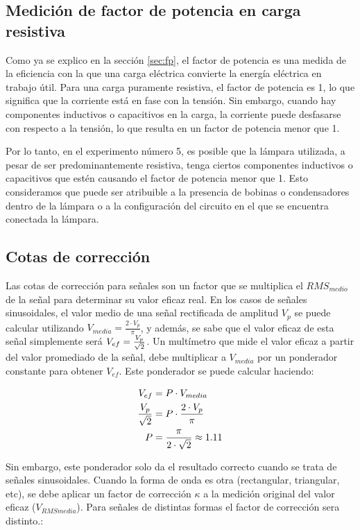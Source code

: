 \subsection{Medición de factor de potencia en carga resistiva}
Como ya se explico en la sección \ref{sec:fp}, el factor de potencia es una medida de la eficiencia con la que una carga eléctrica convierte la energía eléctrica en trabajo útil. Para una carga puramente resistiva, el factor de potencia es 1, lo que significa que la corriente está en fase con la tensión. Sin embargo, cuando hay componentes inductivos o capacitivos en la carga, la corriente puede desfasarse con respecto a la tensión, lo que resulta en un factor de potencia menor que 1.

Por lo tanto, en el experimento número 5, es posible que la lámpara utilizada, a pesar de ser predominantemente resistiva, tenga ciertos componentes inductivos o capacitivos que estén causando el factor de potencia menor que 1. Esto consideramos que puede ser atribuible a la presencia de bobinas o condensadores dentro de la lámpara o a la configuración del circuito en el que se encuentra conectada la lámpara.
\subsection{Cotas de corrección}
Las cotas de corrección para señales son un factor que se multiplica el $RMS_{medio}$ de la señal para determinar su valor eficaz real. En los casos de señales sinusoidales, el valor medio de una señal rectificada de amplitud $V_p$ se puede calcular utilizando $V_{media} = \frac{2\cdot V_p}{\pi}$, y además, se sabe que el valor eficaz de esta señal simplemente será $V_{ef} = {V_p\over\sqrt{2}}$. Un multímetro que mide el valor eficaz a partir del valor promediado de la señal, debe multiplicar a $V_{media}$ por un ponderador constante para obtener $V_{ef}$. Este ponderador se puede calcular haciendo:

\begin{equation}
    \begin{aligned}
    V_{ef} &= P \cdot V_{media} \\
    V_p\over\sqrt{2} &= P \cdot \frac{2\cdot V_p}{\pi} \\
    P &= \frac{\pi}{2\cdot\sqrt{2}} \approx 1.11
    \end{aligned}
\end{equation}


Sin embargo, este ponderador solo da el resultado correcto cuando se trata de señales sinusoidales. Cuando la forma de onda es otra (rectangular, triangular, etc), se debe aplicar un factor de corrección $\kappa$ a la medición original del valor eficaz ($V_{RMSmedia}$). Para señales de distintas formas el factor de corrección sera distinto.:

